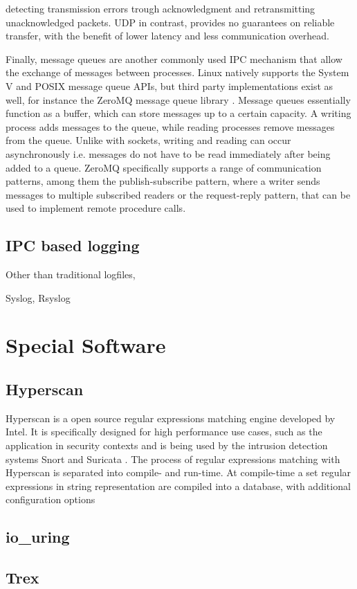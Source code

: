 detecting transmission errors trough acknowledgment and retransmitting unacknowledged packets. \ac{UDP} in contrast, provides no guarantees on reliable transfer, with the benefit of lower latency and less communication overhead. \cite[p.29ff.]{stevens1998sock}
\par
Finally, message queues are another commonly used \ac{IPC} mechanism that allow the exchange of messages between processes. Linux natively supports the System V \cite{systemvshm} and POSIX \cite{posixmsq} message queue APIs, but third party
implementations exist as well, for instance the ZeroMQ message queue library \cite{zeromq}. Message queues essentially function as a buffer, which can store messages up to a certain capacity. A writing process adds messages to the queue, while
reading processes remove messages from the queue. Unlike with sockets, writing and reading can occur asynchronously i.e. messages do not have to be read immediately after being added to a queue. ZeroMQ specifically supports a range of communication 
patterns, among them the publish-subscribe pattern, where a writer sends messages to multiple subscribed readers or the request-reply pattern, that can be used to implement remote procedure calls.         

\subsection{IPC based logging}
\label{sec:ipc_logging}
Other than traditional logfiles, 

Syslog, Rsyslog

\section{Special Software}
\label{sec:softwar}

\subsection{Hyperscan}
\label{sec:hyperscan}

Hyperscan is a open source regular expressions matching engine developed by Intel. 
It is specifically designed for high performance use cases, such as the application in security contexts and is being used by the intrusion detection systems Snort and Suricata \cite{hyperscan}.  
The process of regular expressions matching with Hyperscan is separated into compile- and run-time. At compile-time a set regular expressions in string representation are compiled into a 
database, with additional configuration options  

\subsection{io\_uring}
\label{sec:io_uring}

\subsection{Trex}
\label{sec:trex}
